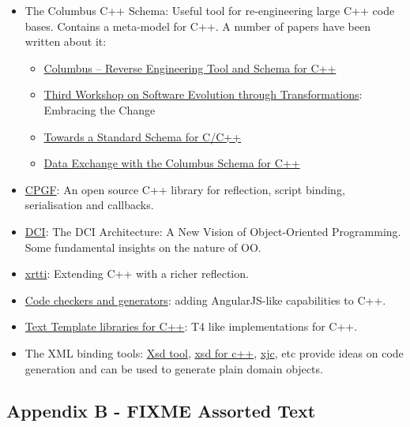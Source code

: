 \documentclass[11pt]{article}
\begin{document}
\begin{itemize}
\item The Columbus C++ Schema: Useful tool for re-engineering large C++
code bases. Contains a meta-model for C++. A number of papers have
been written about it:
\begin{itemize}
\item \href{http://www.inf.u-szeged.hu/~beszedes/research/tech27_ferenc_r.pdf}{Columbus – Reverse Engineering Tool and Schema for C++}
\item \href{http://journal.ub.tu-berlin.de/eceasst/article/download/10/19}{Third Workshop on Software Evolution through Transformations}:
Embracing the Change
\item \href{http://www.inf.u-szeged.hu/~ferenc/research/ferencr_schema.ppt.pdf}{Towards a Standard Schema for C/C++}
\item \href{http://www.inf.u-szeged.hu/~ferenc/research/ferencr_columbus_schema_cpp.pdf}{Data Exchange with the Columbus Schema for C++}
\end{itemize}
\item \href{http://www.cpgf.org/}{CPGF}: An open source C++ library for reflection, script binding,
serialisation and callbacks.
\item \href{http://www.artima.com/articles/dci_vision.html}{DCI}: The DCI Architecture: A New Vision of Object-Oriented
Programming. Some fundamental insights on the nature of OO.
\item \href{http://www.ischo.com/xrtti/index.html}{xrtti}: Extending C++ with a richer reflection.
\item \href{http://www.open-std.org/jtc1/sc22/wg21/docs/papers/2014/n3883.html}{Code checkers and generators}: adding AngularJS-like capabilities to
C++.
\item \href{http://stackoverflow.com/questions/355650/c-html-template-framework-templatizing-library-html-generator-library}{Text Template libraries for C++}: T4 like implementations for C++.
\item The XML binding tools: \href{http://msdn.microsoft.com/en-us/library/x6c1kb0s(v\%3Dvs.110).aspx}{Xsd tool}, \href{http://www.codesynthesis.com/products/xsd/}{xsd for c++}, \href{https://jaxb.java.net/2.2.4/docs/xjc.html}{xjc}, etc provide ideas
on code generation and can be used to generate plain domain objects.
\end{itemize}

\subsection{Appendix B - FIXME Assorted Text}
\label{sec-4-2}
\end{document}
